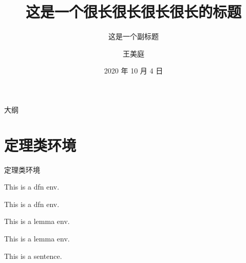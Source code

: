 \documentclass[compress,10pt,dvipsnames,notheorems]{beamer} %
\title[正短标题]{这是一个很长很长很长很长的标题}
\subtitle[副短标题]{这是一个副标题}
\author[王美庭]{王美庭}
\institute[IESR-JNU]{\small\ttfamily 经济与社会研究院，暨南大学}
\date[2020/10/4]{\small 2020 年 10 月 4 日}
\begin{document}
	
\begin{frame} %
	\titlepage
\end{frame}

{
\begin{frame}[noframenumbering]{大纲} %
	\tableofcontents[hideallsubsections]
\end{frame}
}


\section{定理类环境}%

\begin{frame}{定理类环境}
	\begin{dfn}
		This is a dfn env.
	\end{dfn}\vspace{\baselineskip}

	\begin{dfn}\label{dfn:xxx}
		This is a dfn env.
	\end{dfn}\vspace{\baselineskip}
	
	\begin{lemma}
		This is a lemma env.
	\end{lemma}\vspace{\baselineskip}

	\begin{lemma}
		This is a lemma env.
	\end{lemma}\vspace{\baselineskip}

	\begin{thm}
		This is a sentence.
	\end{thm}
\end{frame}
\end{document}

